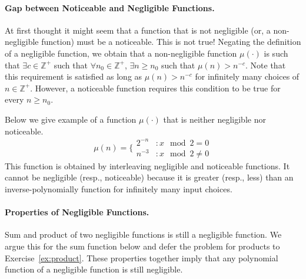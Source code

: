 \paragraph{Gap between Noticeable and Negligible Functions.}
At first thought it might seem that a function that is {not} negligible (or, a non-negligible function) must be a noticeable. This is not true!\cite{JC:Bellare02} Negating the definition of a negligible function, we obtain that a non-negligible function $\mu(\cdot)$ is such that $\exists c \in \mathbb{Z}^+$ such that $\forall n_0 \in \mathbb{Z}^+$, $\exists n \geq n_0$ such that $\mu(n) > n^{-c}$.
Note that this requirement is satisfied as long as $\mu(n) > n^{-c}$ for infinitely many choices of $n \in \mathbb{Z}^+$. However, a noticeable function requires this condition to be true for every $n \geq n_0$.

Below we give example of a function $\mu(\cdot)$ that is neither negligible nor noticeable.
$$\mu(n) = \Big\{
\begin{array}{ll}
  2^{-n} & : x \mod 2 = 0\\
  n^{-3} & : x \mod 2 \neq 0
\end{array}
$$
This function is obtained by interleaving negligible and  noticeable functions. It cannot be negligible (resp., noticeable) because it is greater (resp., less) than an inverse-polynomially function for infinitely many input choices.

\paragraph{Properties of Negligible Functions.} Sum and product of two negligible functions is still a negligible function. We argue this for the sum function below and defer the problem for products to Exercise~\ref{ex:product}. These properties together imply that any polynomial function of a negligible function is still negligible.

